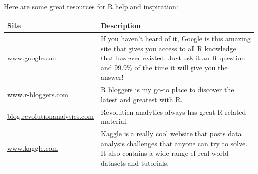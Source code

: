 \documentclass[]{book}
\theoremstyle{definition}
\theoremstyle{definition}
\theoremstyle{remark}
\begin{document}
Here are some great resources for R help and inspiration:

\begin{longtable}[]{@{}ll@{}}
\toprule
\begin{minipage}[b]{0.39\columnwidth}\raggedright\strut
Site\strut
\end{minipage} & \begin{minipage}[b]{0.48\columnwidth}\raggedright\strut
Description\strut
\end{minipage}\tabularnewline
\midrule
\endhead
\begin{minipage}[t]{0.39\columnwidth}\raggedright\strut
\href{http://www.google.com}{www.google.com}\strut
\end{minipage} & \begin{minipage}[t]{0.48\columnwidth}\raggedright\strut
If you haven't heard of it, Google is this amazing site that gives you
access to all R knowledge that has ever existed. Just ask it an R
question and 99.9\% of the time it will give you the answer!\strut
\end{minipage}\tabularnewline
\begin{minipage}[t]{0.39\columnwidth}\raggedright\strut
\href{http://www.r-bloggers.com}{www.r-bloggers.com}\strut
\end{minipage} & \begin{minipage}[t]{0.48\columnwidth}\raggedright\strut
R bloggers is my go-to place to discover the latest and greatest with
R.\strut
\end{minipage}\tabularnewline
\begin{minipage}[t]{0.39\columnwidth}\raggedright\strut
\href{http://blog.revolutionanalytics.com}{blog.revolutionanalytics.com}\strut
\end{minipage} & \begin{minipage}[t]{0.48\columnwidth}\raggedright\strut
Revolution analytics always has great R related material.\strut
\end{minipage}\tabularnewline
\begin{minipage}[t]{0.39\columnwidth}\raggedright\strut
\href{http://www.kaggle.com}{www.kaggle.com}\strut
\end{minipage} & \begin{minipage}[t]{0.48\columnwidth}\raggedright\strut
Kaggle is a really cool website that posts data analysis challenges that
anyone can try to solve. It also contains a wide range of real-world
datasets and tutorials.\strut
\end{minipage}\tabularnewline
\bottomrule
\end{longtable}
\end{document}
